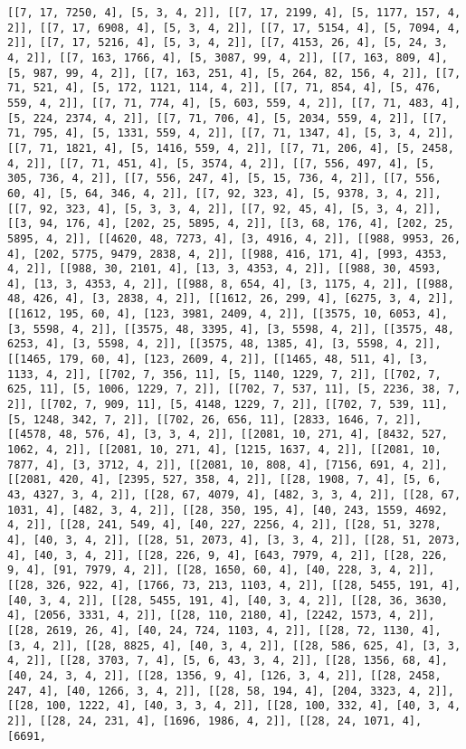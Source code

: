 \documentclass[12pt,fleqn]{article}\usepackage{../../common}
\begin{document}
\begin{verbatim}
[[7, 17, 7250, 4], [5, 3, 4, 2]], [[7, 17, 2199, 4], [5, 1177, 157, 4, 2]], [[7, 17, 6908, 4], [5, 3, 4, 2]], [[7, 17, 5154, 4], [5, 7094, 4, 2]], [[7, 17, 5216, 4], [5, 3, 4, 2]], [[7, 4153, 26, 4], [5, 24, 3, 4, 2]], [[7, 163, 1766, 4], [5, 3087, 99, 4, 2]], [[7, 163, 809, 4], [5, 987, 99, 4, 2]], [[7, 163, 251, 4], [5, 264, 82, 156, 4, 2]], [[7, 71, 521, 4], [5, 172, 1121, 114, 4, 2]], [[7, 71, 854, 4], [5, 476, 559, 4, 2]], [[7, 71, 774, 4], [5, 603, 559, 4, 2]], [[7, 71, 483, 4], [5, 224, 2374, 4, 2]], [[7, 71, 706, 4], [5, 2034, 559, 4, 2]], [[7, 71, 795, 4], [5, 1331, 559, 4, 2]], [[7, 71, 1347, 4], [5, 3, 4, 2]], [[7, 71, 1821, 4], [5, 1416, 559, 4, 2]], [[7, 71, 206, 4], [5, 2458, 4, 2]], [[7, 71, 451, 4], [5, 3574, 4, 2]], [[7, 556, 497, 4], [5, 305, 736, 4, 2]], [[7, 556, 247, 4], [5, 15, 736, 4, 2]], [[7, 556, 60, 4], [5, 64, 346, 4, 2]], [[7, 92, 323, 4], [5, 9378, 3, 4, 2]], [[7, 92, 323, 4], [5, 3, 3, 4, 2]], [[7, 92, 45, 4], [5, 3, 4, 2]], [[3, 94, 176, 4], [202, 25, 5895, 4, 2]], [[3, 68, 176, 4], [202, 25, 5895, 4, 2]], [[4620, 48, 7273, 4], [3, 4916, 4, 2]], [[988, 9953, 26, 4], [202, 5775, 9479, 2838, 4, 2]], [[988, 416, 171, 4], [993, 4353, 4, 2]], [[988, 30, 2101, 4], [13, 3, 4353, 4, 2]], [[988, 30, 4593, 4], [13, 3, 4353, 4, 2]], [[988, 8, 654, 4], [3, 1175, 4, 2]], [[988, 48, 426, 4], [3, 2838, 4, 2]], [[1612, 26, 299, 4], [6275, 3, 4, 2]], [[1612, 195, 60, 4], [123, 3981, 2409, 4, 2]], [[3575, 10, 6053, 4], [3, 5598, 4, 2]], [[3575, 48, 3395, 4], [3, 5598, 4, 2]], [[3575, 48, 6253, 4], [3, 5598, 4, 2]], [[3575, 48, 1385, 4], [3, 5598, 4, 2]], [[1465, 179, 60, 4], [123, 2609, 4, 2]], [[1465, 48, 511, 4], [3, 1133, 4, 2]], [[702, 7, 356, 11], [5, 1140, 1229, 7, 2]], [[702, 7, 625, 11], [5, 1006, 1229, 7, 2]], [[702, 7, 537, 11], [5, 2236, 38, 7, 2]], [[702, 7, 909, 11], [5, 4148, 1229, 7, 2]], [[702, 7, 539, 11], [5, 1248, 342, 7, 2]], [[702, 26, 656, 11], [2833, 1646, 7, 2]], [[4578, 48, 576, 4], [3, 3, 4, 2]], [[2081, 10, 271, 4], [8432, 527, 1062, 4, 2]], [[2081, 10, 271, 4], [1215, 1637, 4, 2]], [[2081, 10, 7877, 4], [3, 3712, 4, 2]], [[2081, 10, 808, 4], [7156, 691, 4, 2]], [[2081, 420, 4], [2395, 527, 358, 4, 2]], [[28, 1908, 7, 4], [5, 6, 43, 4327, 3, 4, 2]], [[28, 67, 4079, 4], [482, 3, 3, 4, 2]], [[28, 67, 1031, 4], [482, 3, 4, 2]], [[28, 350, 195, 4], [40, 243, 1559, 4692, 4, 2]], [[28, 241, 549, 4], [40, 227, 2256, 4, 2]], [[28, 51, 3278, 4], [40, 3, 4, 2]], [[28, 51, 2073, 4], [3, 3, 4, 2]], [[28, 51, 2073, 4], [40, 3, 4, 2]], [[28, 226, 9, 4], [643, 7979, 4, 2]], [[28, 226, 9, 4], [91, 7979, 4, 2]], [[28, 1650, 60, 4], [40, 228, 3, 4, 2]], [[28, 326, 922, 4], [1766, 73, 213, 1103, 4, 2]], [[28, 5455, 191, 4], [40, 3, 4, 2]], [[28, 5455, 191, 4], [40, 3, 4, 2]], [[28, 36, 3630, 4], [2056, 3331, 4, 2]], [[28, 110, 2180, 4], [2242, 1573, 4, 2]], [[28, 2619, 26, 4], [40, 24, 724, 1103, 4, 2]], [[28, 72, 1130, 4], [3, 4, 2]], [[28, 8825, 4], [40, 3, 4, 2]], [[28, 586, 625, 4], [3, 3, 4, 2]], [[28, 3703, 7, 4], [5, 6, 43, 3, 4, 2]], [[28, 1356, 68, 4], [40, 24, 3, 4, 2]], [[28, 1356, 9, 4], [126, 3, 4, 2]], [[28, 2458, 247, 4], [40, 1266, 3, 4, 2]], [[28, 58, 194, 4], [204, 3323, 4, 2]], [[28, 100, 1222, 4], [40, 3, 3, 4, 2]], [[28, 100, 332, 4], [40, 3, 4, 2]], [[28, 24, 231, 4], [1696, 1986, 4, 2]], [[28, 24, 1071, 4], [6691, 
\end{verbatim}
\end{document}
